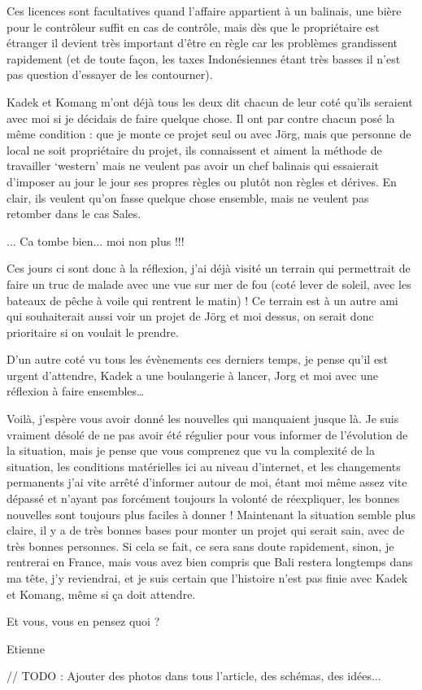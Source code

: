 Ces licences sont facultatives quand l’affaire appartient à un balinais, une bière pour le contrôleur suffit en cas de contrôle, mais dès que le propriétaire est étranger il devient très important d’être en règle car les problèmes grandissent rapidement (et de toute façon, les taxes Indonésiennes étant très basses il n’est pas question d’essayer de les contourner).

Kadek et Komang m’ont déjà tous les deux dit chacun de leur coté qu’ils seraient avec moi si je décidais de faire quelque chose. Il ont par contre chacun posé la même condition : que je monte ce projet seul ou avec Jörg, mais que personne de local ne soit propriétaire du projet, ils connaissent et aiment la méthode de travailler ‘western’ mais ne veulent pas avoir un chef balinais qui essaierait d’imposer au jour le jour ses propres règles ou plutôt non règles et dérives. En clair, ils veulent qu’on fasse quelque chose ensemble, mais ne veulent pas retomber dans le cas Sales.

... Ca tombe bien... moi non plus !!!

Ces jours ci sont donc à la réflexion, j’ai déjà visité un terrain qui permettrait de faire un truc de malade avec une vue sur mer de fou (coté lever de soleil, avec les bateaux de pêche à voile qui rentrent le matin) ! Ce terrain est à un autre ami qui souhaiterait aussi voir un projet de Jörg et moi dessus, on serait donc prioritaire si on voulait le prendre.

D’un autre coté vu tous les évènements ces derniers temps, je pense qu’il est urgent d’attendre, Kadek a une boulangerie à lancer, Jorg et moi avec une réflexion à faire ensembles…

Voilà, j’espère vous avoir donné les nouvelles qui manquaient jusque là. Je suis vraiment désolé de ne pas avoir été régulier pour vous informer de l’évolution de la situation, mais je pense que vous comprenez que vu la complexité de la situation, les conditions matérielles ici au niveau d’internet, et les changements permanents j’ai vite arrêté d’informer autour de moi, étant moi même assez vite dépassé et n’ayant pas forcément toujours la volonté de réexpliquer, les bonnes nouvelles sont toujours plus faciles à donner ! Maintenant la situation semble plus claire, il y a de très bonnes bases pour monter un projet qui serait sain, avec de très bonnes personnes. Si cela se fait, ce sera sans doute rapidement, sinon, je rentrerai en France, mais vous avez bien compris que Bali restera longtemps dans ma tête, j’y reviendrai, et je suis certain que l’histoire n’est pas finie avec Kadek et Komang, même si ça doit attendre.

Et vous, vous en pensez quoi ?

Etienne

// TODO : Ajouter des photos dans tous l'article, des schémas, des idées...


\vfill
